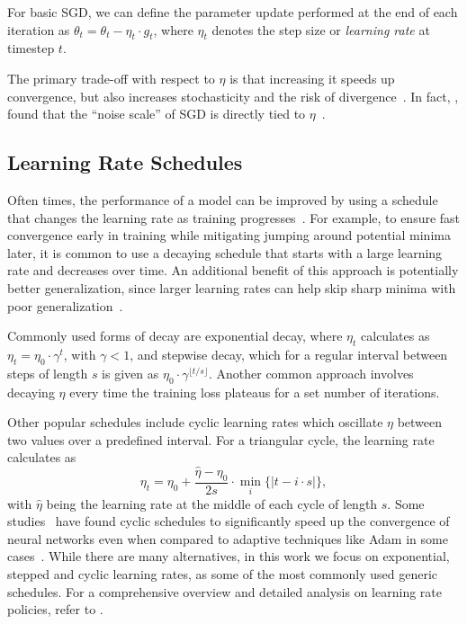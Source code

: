 \documentclass[runningheads]{llncs}
\begin{document}
For basic SGD, we can define the parameter update performed at the end of each iteration as $\theta_{t}  = \theta_{t} - \eta_t \cdot g_t$,
where $\eta_t$ denotes the step size or \textit{learning rate} at timestep $t$.

The primary trade-off with respect to $\eta$ is that increasing it speeds up convergence, but also increases stochasticity and the risk of divergence~\cite{bengioPracticalRecommendationsGradientbased2012}.
In fact, \textcite{smithBayesianPerspectiveGeneralization2018}, found that the “noise scale” of SGD is directly tied to $\eta$~\cite{smithBayesianPerspectiveGeneralization2018}.

\subsection{Learning Rate Schedules}

Often times, the performance of a model can be improved by using a schedule that changes the learning rate as training progresses~\cite{wuDemystifyingLearningRate2019b}.
For example, to ensure fast convergence early in training while mitigating jumping around potential minima later, it is common to use a decaying schedule that starts with a large learning rate and decreases over time.
An additional benefit of this approach is potentially better generalization, since larger learning rates can help skip sharp minima with poor generalization~\cite{hochreiterFlatMinima1997,chaudhariEntropySGDBiasingGradient2017}.

Commonly used forms of decay are exponential decay, where $\eta_{t}$ calculates as
$\eta_{t} = \eta_0 \cdot \gamma^t$,
with $\gamma < 1$, and stepwise decay, which for a regular interval between steps of length $s$ is given as $\eta_0 \cdot \gamma^{\lfloor t/s \rfloor}$.
Another common approach involves decaying $\eta$ every time the training loss plateaus for a set number of iterations.

Other popular schedules include cyclic learning rates which oscillate $\eta$ between two values over a predefined interval.
For a triangular cycle, the learning rate calculates as
\begin{equation}
	\eta_t = \eta_0 + \frac{\hat{\eta} - \eta_0}{2s} \cdot \min_{i} \{|t-i\cdot s|\},
\end{equation}
with $\hat{\eta}$ being the learning rate at the middle of each cycle of length $s$.
Some studies~\cite{smithCyclicalLearningRates2017, smithSuperConvergenceVeryFast2018a} have found cyclic schedules to significantly speed up the convergence of neural networks even when compared to adaptive techniques like Adam in some cases~\cite{kingmaAdamMethodStochastic2017b}.
While there are many alternatives, in this work we focus on  exponential, stepped and cyclic learning rates, as some of the most commonly used generic schedules.
For a comprehensive overview and detailed analysis on learning rate policies, refer to \textcite{wuDemystifyingLearningRate2019b}.
\end{document}
